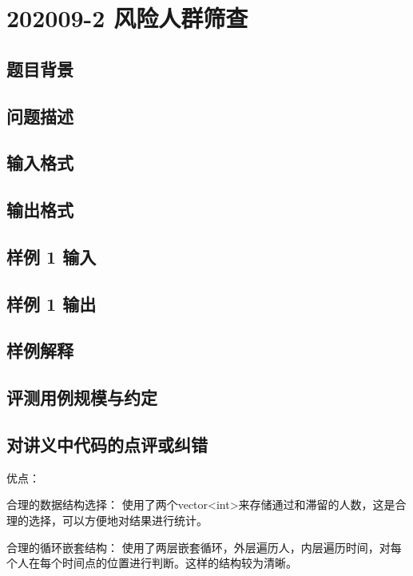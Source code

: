 \section{202009-2 风险人群筛查}

\subsection{题目背景}

\subsection{问题描述}

\subsection{输入格式}

\subsection{输出格式}

\subsection{样例 1 输入}

\subsection{样例 1 输出}

\subsection{样例解释}

\subsection{评测用例规模与约定}

\subsection{对讲义中代码的点评或纠错}
 
优点：

合理的数据结构选择： 使用了两个vector<int>来存储通过和滞留的人数，这是合理的选择，可以方便地对结果进行统计。

合理的循环嵌套结构： 使用了两层嵌套循环，外层遍历人，内层遍历时间，对每个人在每个时间点的位置进行判断。这样的结构较为清晰。

